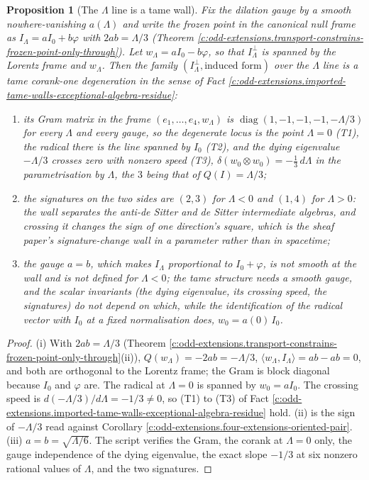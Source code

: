 \documentclass[11pt]{article}
\newtheorem{proposition}[theorem]{Proposition}
\theoremstyle{definition}
\theoremstyle{plain}
\newcommand{\changedmark}[2]{\marginpar{\raggedright\scriptsize\color{#1}#2}}
\providecommand{\ip}{}\renewcommand{\ip}[2]{\langle #1, #2\rangle}
\begin{document}
\begin{proposition}[The $\Lambda$ line is a tame wall]\label{c:odd-extensions.line-tame-wall}
\changedmark{gray}{reworded}
Fix the dilation gauge by a smooth nowhere-vanishing $a(\Lambda)$ and write the frozen point in the canonical null frame as $I_{\Lambda} = a I_{0} + b\varphi$ with $2ab = \Lambda/3$ (Theorem \ref{c:odd-extensions.transport-constrains-frozen-point-only-through}). Let $w_{\Lambda} = aI_{0} - b\varphi$, so that $I_{\Lambda}^{\perp}$ is spanned by the Lorentz frame and $w_{\Lambda}$. Then the family $(I_{\Lambda}^{\perp}, \text{induced form})$ over the $\Lambda$ line is a tame corank-one degeneration in the sense of Fact \ref{c:odd-extensions.imported-tame-walls-exceptional-algebra-residue}:
\begin{enumerate}
\item[(i)] its Gram matrix in the frame $(e_{1}, \ldots, e_{4}, w_{\Lambda})$ is $\operatorname{diag}(1,-1,-1,-1,-\Lambda/3)$ for every $\Lambda$ and every gauge, so the degenerate locus is the point $\Lambda = 0$ (T1), the radical there is the line spanned by $I_{0}$ (T2), and the dying eigenvalue $-\Lambda/3$ crosses zero with nonzero speed (T3), $\delta(w_{0} \otimes w_{0}) = -\tfrac13\,d\Lambda$ in the parametrisation by $\Lambda$, the $3$ being that of $Q(I) = \Lambda/3$;
\item[(ii)] the signatures on the two sides are $(2,3)$ for $\Lambda < 0$ and $(1,4)$ for $\Lambda > 0$: the wall separates the anti-de Sitter and de Sitter intermediate algebras, and crossing it changes the sign of one direction's square, which is the sheaf paper's signature-change wall in a parameter rather than in spacetime;
\item[(iii)] the gauge $a = b$, which makes $I_{\Lambda}$ proportional to $I_{0} + \varphi$, is not smooth at the wall and is not defined for $\Lambda < 0$; the tame structure needs a smooth gauge, and the scalar invariants (the dying eigenvalue, its crossing speed, the signatures) do not depend on which, while the identification of the radical vector with $I_{0}$ at a fixed normalisation does, $w_{0} = a(0)\,I_{0}$.
\end{enumerate}
\end{proposition}
\begin{proof}
(i) With $2ab = \Lambda/3$ (Theorem \ref{c:odd-extensions.transport-constrains-frozen-point-only-through}(ii)), $Q(w_{\Lambda}) = -2ab = -\Lambda/3$, $\ip{w_{\Lambda}}{I_{\Lambda}} = ab - ab = 0$, and both are orthogonal to the Lorentz frame; the Gram is block diagonal because $I_{0}$ and $\varphi$ are. The radical at $\Lambda = 0$ is spanned by $w_{0} = aI_{0}$. The crossing speed is $d(-\Lambda/3)/d\Lambda = -1/3 \neq 0$, so (T1) to (T3) of Fact \ref{c:odd-extensions.imported-tame-walls-exceptional-algebra-residue} hold. (ii) is the sign of $-\Lambda/3$ read against Corollary \ref{c:odd-extensions.four-extensions-oriented-pair}. (iii) $a = b = \sqrt{\Lambda/6}$. The script verifies the Gram, the corank at $\Lambda = 0$ only, the gauge independence of the dying eigenvalue, the exact slope $-1/3$ at six nonzero rational values of $\Lambda$, and the two signatures.

\end{proof}
\end{document}
